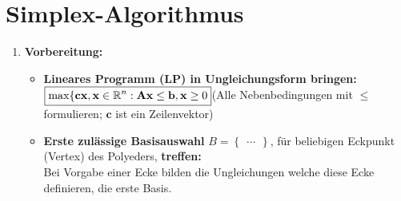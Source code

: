 \section{Simplex-Algorithmus}

\begin{enumerate}
\item \textbf{Vorbereitung:}\\
	\begin{itemize}
	\item \textbf{Lineares Programm (LP) in Ungleichungsform bringen:}\\
	$\boxed{\max\{\mathbf{c} \mathbf{x}, \mathbf{x}\in\mathbb{R}^n :\mathbf{Ax}\leq \mathbf{b}, \mathbf{x} \geq 0\\}$\quad(Alle Nebenbedingungen mit $\leq$ formulieren; $\mathbf{c}$ ist ein Zeilenvektor)
	\item \textbf{Erste zulässige Basisauswahl} $B=\begin{Bmatrix}\ldots\end{Bmatrix}$, für beliebigen Eckpunkt (Vertex) des Polyeders, \textbf{treffen:}\\
	Bei Vorgabe einer Ecke bilden die Ungleichungen welche diese Ecke definieren, die erste Basis.
	\end{itemize}
	
	\vspace{0.3cm}
	

\end{enumerate}
